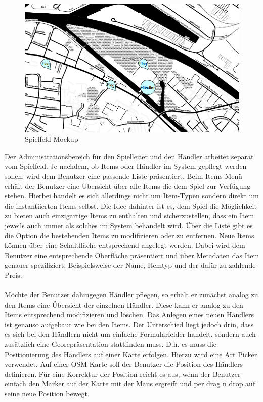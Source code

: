 \begin{figure}[H]
\begin{center}
\includegraphics[width=140mm]{images/ch5_img05_dialog.png}
\caption{Spielfeld Mockup}
\label{img:ch5_img05_dialog}
\end{center}
\end{figure}

Der Administrationsbereich für den Spielleiter und den Händler arbeitet separat vom Spielfeld.
Je nachdem, ob Items oder Händler im System gepflegt werden sollen, wird dem Benutzer eine passende Liste präsentiert.
Beim Items Menü erhält der Benutzer eine Übersicht über alle Items die dem Spiel zur Verfügung stehen. Hierbei handelt es sich allerdings nicht um Item-Typen sondern direkt um die instantiierten Items selbst. Die Idee dahinter ist es, dem Spiel die Möglichkeit zu bieten auch einzigartige Items zu enthalten und sicherzustellen, dass ein Item jeweils auch immer als solches im System behandelt wird. Über die Liste gibt es die Option die bestehenden Items zu modifizieren oder zu entfernen. Neue Items können über eine Schaltfläche entsprechend angelegt werden. Dabei wird dem Benutzer eine entsprechende Oberfläche präsentiert und über Metadaten das Item genauer spezifiziert. Beispielsweise der Name, Itemtyp und der dafür  zu zahlende Preis.
\\\\
Möchte der Benutzer dahingegen Händler pflegen, so erhält er zunächst analog zu den Items eine Übersicht der einzelnen Händler.
Diese kann er analog zu den Items entsprechend modifizieren und löschen. Das Anlegen eines neuen Händlers ist genauso aufgebaut wie bei den Items. Der Unterschied liegt jedoch drin, dass es sich bei den Händlern nicht um einfache Formularfelder handelt, sondern auch zusätzlich eine Georepräsentation stattfinden muss. D.h. es muss die Positionierung des Händlers auf einer Karte erfolgen. Hierzu wird eine Art \glqq Picker\grqq{} verwendet. Auf einer OSM Karte soll der Benutzer die Position des Händlers definieren. Für eine Korrektur der Position reicht es aus, wenn der Benutzer einfach den Marker auf der Karte mit der Maus ergreift und per drag n drop auf seine neue Position bewegt.

